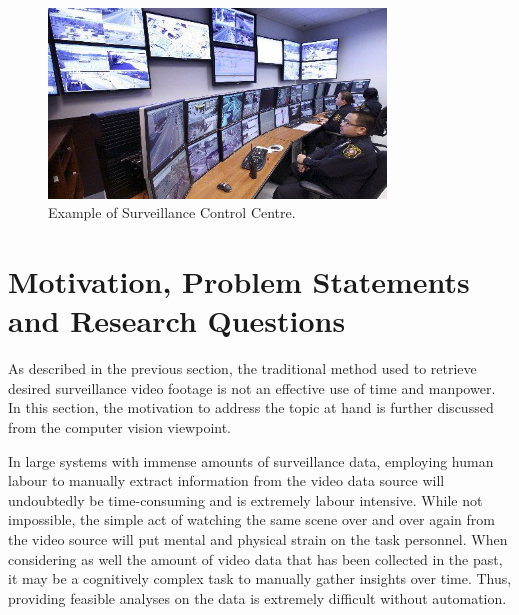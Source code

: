 \begin{figure}[!hbt]\centering
\includegraphics[width=0.8\textwidth]{image/screenshots/observer.jpg}
\caption{Example of Surveillance Control Centre.}
\label{fig:observerdatacenter}
\end{figure}

\section{Motivation, Problem Statements and Research Questions}

As described in the previous section, the traditional method used to retrieve desired surveillance video footage is not an effective use of time and manpower. In this section, the motivation to address the topic at hand is further discussed from the computer vision viewpoint.%


In large systems with immense amounts of surveillance data, employing human labour to manually extract information from the video data source will undoubtedly be time-consuming and is extremely labour intensive.
While not impossible, the simple act of watching the same scene over and over again from the video source will put mental and physical strain on the task personnel. When considering as well the amount of video data that has been collected in the past, it may be a cognitively complex task to manually gather insights over time. Thus, providing feasible analyses on the data is extremely difficult without automation.

